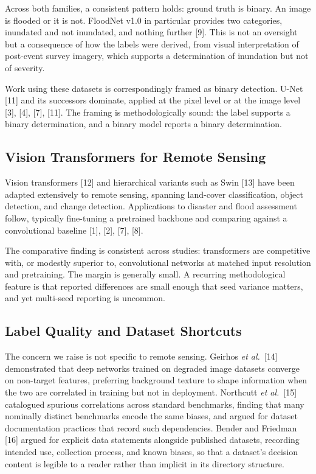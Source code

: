 \documentclass[11pt,journal]{IEEEtran}
\begin{document}
Across both families, a consistent pattern holds: ground truth is binary. An
image is flooded or it is not. FloodNet v1.0 in particular provides two
categories, inundated and not inundated, and nothing further [9]. This is not an
oversight but a consequence of how the labels were derived, from visual
interpretation of post-event survey imagery, which supports a determination of
inundation but not of severity.

Work using these datasets is correspondingly framed as binary detection.
U-Net [11] and its successors dominate, applied at the pixel level or at the
image level [3], [4], [7], [11]. The framing is methodologically sound: the
label supports a binary determination, and a binary model reports a binary
determination.

\subsection{Vision Transformers for Remote Sensing}

Vision transformers [12] and hierarchical variants such as Swin [13] have been
adapted extensively to remote sensing, spanning land-cover classification,
object detection, and change detection. Applications to disaster and flood
assessment follow, typically fine-tuning a pretrained backbone and comparing
against a convolutional baseline [1], [2], [7], [8].

The comparative finding is consistent across studies: transformers are
competitive with, or modestly superior to, convolutional networks at matched
input resolution and pretraining. The margin is generally small. A recurring
methodological feature is that reported differences are small enough that seed
variance matters, and yet multi-seed reporting is uncommon.

\subsection{Label Quality and Dataset Shortcuts}

The concern we raise is not specific to remote sensing. Geirhos
\emph{et al.}~[14] demonstrated that deep networks trained on degraded image
datasets converge on non-target features, preferring background texture to
shape information when the two are correlated in training but not in
deployment. Northcutt \emph{et al.}~[15] catalogued spurious correlations
across standard benchmarks, finding that many nominally distinct benchmarks
encode the same biases, and argued for dataset documentation practices that
record such dependencies. Bender and Friedman [16] argued for explicit data
statements alongside published datasets, recording intended use, collection
process, and known biases, so that a dataset's decision content is legible to a
reader rather than implicit in its directory structure.
\end{document}
